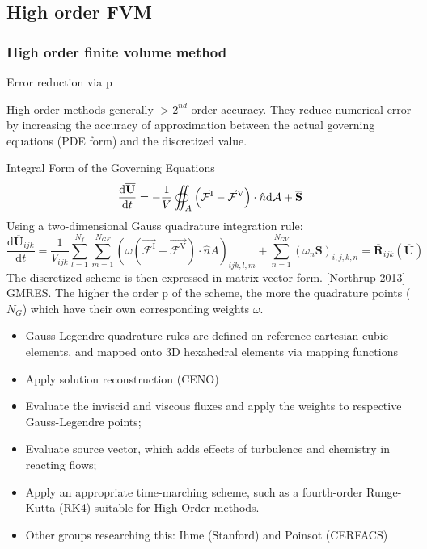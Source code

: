 \documentclass{beamer}
\begin{document}
\subsection{High order FVM}
\begin{frame}%
\frametitle{High order finite volume method}
\begin{minipage}[t][1\textheight]{1\textwidth}
\vspace{-20pt}
\begin{exampleblock}{Error reduction via p}
\tiny

High order methods  generally $ > 2^{nd}$ order accuracy. They reduce numerical error by increasing the accuracy of approximation between the actual governing equations (PDE form) and the discretized value.

\begin{block}{Integral Form of the Governing Equations}
     \[
      \frac{\mathrm{d}\overline{\mathbf{U}}}{\mathrm{d}t} = 
      - \frac{1}{V} \oiint_A \left( \vec{\mathcal{F}}^{\rm I} - 
      \vec{\mathcal{F}}^{\rm V} \right) \cdot \hat{n} \mathrm{d}\mathcal{A} + 
      \overline{\mathbf{S}}
     \] 
    Using a two-dimensional Gauss quadrature integration rule:
    \[  \frac{\mathrm{d}\overline{\mathbf{U}}_{ijk}}{\mathrm{d}t} = 
       \frac{1}{{V}_{ijk}} \sum_{l=1}^{N_f}     
      \sum_{m=1}^{N_{GF}} \left( \omega \left(\vec{\mathcal{F}^{\mathrm{I}}} - 
      \vec{\mathcal{F}^{\mathrm{V}}} \right)\cdot \hat{n} {A} \right)_{ijk,l,m} 
      + \sum_{n=1}^{N_{GV}} \left( \omega_n {\mathbf{S}} \right)_{i,j,k,n}      
       = \overline{\mathbf{R}}_{ijk}  \left( \overline{\mathbf{U}} \right) \]
    The discretized scheme is then expressed in matrix-vector form. [Northrup 2013] GMRES.   
    The higher the order p of the scheme, the more the quadrature points ($ N_G $) which have their own corresponding weights $ \omega $.
\end{block}

\vspace{-10pt}
\begin{itemize}
\tiny
\item Gauss-Legendre quadrature rules are defined on reference cartesian cubic elements, and mapped onto 3D hexahedral elements via mapping functions
\item Apply solution reconstruction (CENO)
\item Evaluate the inviscid and viscous fluxes and apply the weights to respective Gauss-Legendre points;
\item Evaluate source vector, which adds effects of turbulence and chemistry in reacting flows;
\item Apply an appropriate time-marching scheme, such as a fourth-order Runge-Kutta (RK4) suitable for High-Order methods.
\item Other groups researching this: Ihme (Stanford) and Poinsot (CERFACS)
\end{itemize}
\end{exampleblock}
\end{minipage}


\end{frame}
\end{document}
